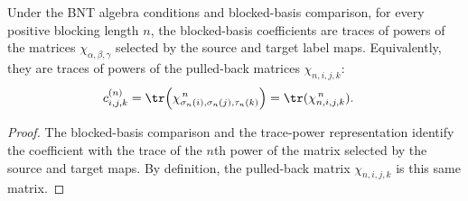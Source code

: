 \begin{corollary}%
    \label{cor:mpdo_bnt_label_theorem_data_blocked_coeff_eq_positive_blocked_chi_trace_pow}
    \leanok
    Under the BNT algebra conditions and blocked-basis comparison, for every
    positive blocking length $n$, the blocked-basis coefficients are
    traces of powers of the matrices $\chi_{\alpha,\beta,\gamma}$ selected
    by the source and target label maps. Equivalently, they are traces of
    powers of the pulled-back matrices $\chi_{n,i,j,k}$:
    \begin{align}
        c^{(n)}_{i,j,k}
         & =
        \tr\!\left(\chi_{\sigma_n(i),\sigma_n(j),\tau_n(k)}^{\,n}\right)
        =\tr(\chi_{n,i,j,k}^{\,n}).
        \notag
    \end{align}
\end{corollary}
\begin{proof}\leanok
    The blocked-basis comparison and the trace-power representation identify
    the coefficient with the trace of the $n$th power of the matrix
    selected by the source and target maps. By definition, the pulled-back
    matrix $\chi_{n,i,j,k}$ is this same matrix.
\end{proof}
